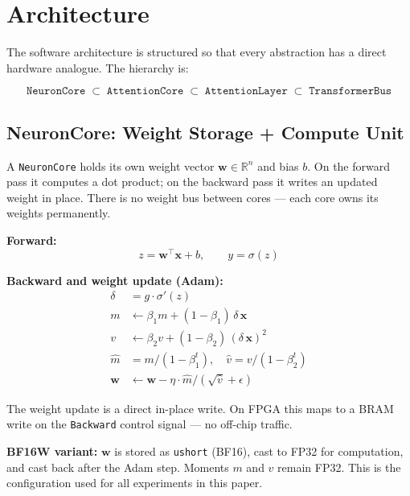 \documentclass[11pt]{article}
\begin{document}
\section{Architecture}

The software architecture is structured so that every abstraction has a direct
hardware analogue. The hierarchy is:

\[
\texttt{NeuronCore} \;\subset\; \texttt{AttentionCore} \;\subset\;
\texttt{AttentionLayer} \;\subset\; \texttt{TransformerBus}
\]

\subsection{NeuronCore: Weight Storage + Compute Unit}

A \texttt{NeuronCore} holds its own weight vector $\mathbf{w} \in \mathbb{R}^n$
and bias $b$. On the forward pass it computes a dot product; on the backward pass
it writes an updated weight in place. There is no weight bus between cores --- each
core owns its weights permanently.

\textbf{Forward:}
\begin{equation}
z = \mathbf{w}^\top \mathbf{x} + b, \qquad y = \sigma(z)
\end{equation}

\textbf{Backward and weight update (Adam):}
\begin{align}
\delta &= g \cdot \sigma'(z) \\
m &\leftarrow \beta_1 m + (1-\beta_1)\,\delta\,\mathbf{x} \\
v &\leftarrow \beta_2 v + (1-\beta_2)\,(\delta\,\mathbf{x})^2 \\
\hat{m} &= m / (1-\beta_1^t), \quad \hat{v} = v / (1-\beta_2^t) \\
\mathbf{w} &\leftarrow \mathbf{w} - \eta \cdot \hat{m} / (\sqrt{\hat{v}} + \epsilon)
\end{align}

The weight update is a direct in-place write. On FPGA this maps to a BRAM write
on the \texttt{Backward} control signal --- no off-chip traffic.

\textbf{BF16W variant:} $\mathbf{w}$ is stored as \texttt{ushort} (BF16), cast to
FP32 for computation, and cast back after the Adam step. Moments $m$ and $v$ remain FP32.
This is the configuration used for all experiments in this paper.
\end{document}
